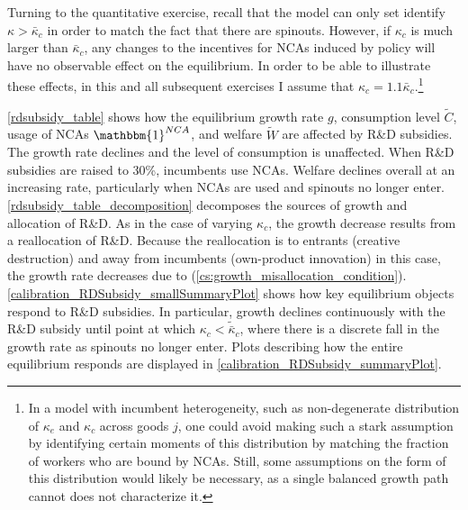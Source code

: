 \documentclass[ecta,nameyear,final]{econsocart}
\theoremstyle{plain}
\theoremstyle{remark}
\begin{document}
Turning to the quantitative exercise, recall that the model can only set identify $\kappa > \bar{\kappa}_c$ in order to match the fact that there are spinouts. However, if $\kappa_c$ is much larger than $\bar{\kappa}_c$, any changes to the incentives for NCAs induced by policy will have no observable effect on the equilibrium. In order to be able to illustrate these effects, in this and all subsequent exercises I assume that $\kappa_c = 1.1 \bar{\kappa}_c$.\footnote{In a model with incumbent heterogeneity, such as non-degenerate distribution of $\kappa_e$ and $\kappa_c$ across goods $j$, one could avoid making such a stark assumption by identifying certain moments of this distribution by matching the fraction of workers who are bound by NCAs. Still, some assumptions on the form of this distribution would likely be necessary, as a single balanced growth path cannot does not characterize it.}

\autoref{rdsubsidy_table} shows how the equilibrium growth rate $g$, consumption level $\tilde{C}$, usage of NCAs $\mathbbm{1}^{NCA}$, and welfare $\tilde{W}$ are affected by R\&D subsidies. The growth rate declines and the level of consumption is unaffected. When R\&D subsidies are raised to 30\%, incumbents use NCAs. Welfare declines overall at an increasing rate, particularly when NCAs are used and spinouts no longer enter.  \autoref{rdsubsidy_table_decomposition} decomposes the sources of growth and allocation of R\&D. As in the case of varying $\kappa_c$, the growth decrease results from a reallocation of R\&D. Because the reallocation is to entrants (creative destruction) and away from incumbents (own-product innovation) in this case, the growth rate decreases due to (\ref{cs:growth_misallocation_condition}). \autoref{calibration_RDSubsidy_smallSummaryPlot} shows how key equilibrium objects respond to R\&D subsidies. In particular, growth declines continuously with the R\&D subsidy until point at which $\kappa_c < \tilde{\bar{\kappa}}_c$, where there is a discrete fall in the growth rate as spinouts no longer enter. Plots describing how the entire equilibrium responds are displayed in \autoref{calibration_RDSubsidy_summaryPlot}. 
\end{document}
